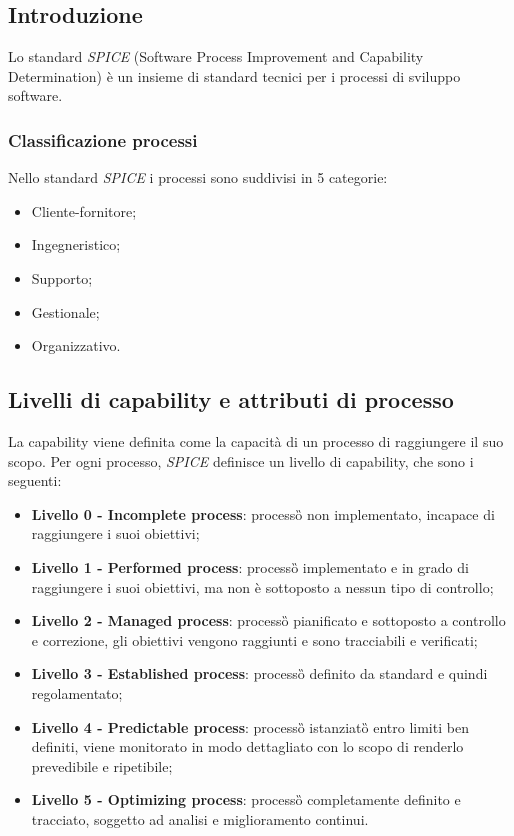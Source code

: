 \subsection{Introduzione}
Lo standard \textit{SPICE} (Software Process Improvement and Capability Determination) è un insieme di
standard tecnici per i processi di sviluppo software.

\subsubsection{Classificazione processi}
Nello standard \textit{SPICE} i processi sono suddivisi in 5 categorie:
\begin{itemize}
	\item Cliente-fornitore;
	\item Ingegneristico;
	\item Supporto;
	\item Gestionale;
	\item Organizzativo.
\end{itemize}

\subsection{Livelli di capability e attributi di processo}
La capability viene definita come la capacità di un processo di raggiungere il suo scopo. Per ogni processo, \textit{SPICE} definisce un livello di capability, che sono i seguenti:
\begin{itemize}
	\item \textbf{Livello 0 - Incomplete process}: processo\G{} non implementato, incapace di raggiungere i suoi
	obiettivi;
	\item \textbf{Livello 1 - Performed process}: processo\G{} implementato e in grado di raggiungere i suoi obiettivi,
	ma non è sottoposto a nessun tipo di controllo;
	\item \textbf{Livello 2 - Managed process}: processo\G{} pianificato e sottoposto a controllo e correzione, gli
	obiettivi vengono raggiunti e sono tracciabili e verificati;
	\item \textbf{Livello 3 - Established process}: processo\G{} definito da standard e quindi regolamentato;
	\item \textbf{Livello 4 - Predictable process}: processo\G{} istanziato\G{} entro limiti ben definiti, viene monitorato
	in modo dettagliato con lo scopo di renderlo prevedibile e ripetibile;
	\item \textbf{Livello 5 - Optimizing process}: processo\G{} completamente definito e tracciato, soggetto ad analisi
	e miglioramento continui.
\end{itemize}
 
